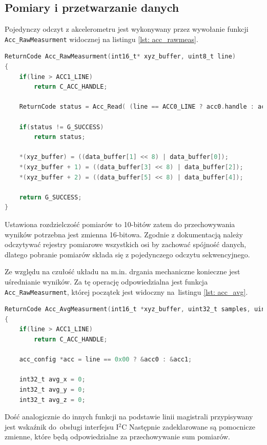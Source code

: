 \subsection{Pomiary i przetwarzanie danych}
Pojedynczy odczyt z akcelerometru jest wykonywany przez wywołanie funkcji \texttt{Acc\_RawMeasurment} widocznej na listingu \ref{lst: acc_rawmeas}.
\begin{lstlisting}[language=C,
caption={Funkcja realizująca pomiary},
label={lst: acc_rawmeas}]
ReturnCode Acc_RawMeasurment(int16_t* xyz_buffer, uint8_t line)
{
	if(line > ACC1_LINE)
		return C_ACC_HANDLE;

	ReturnCode status = Acc_Read( (line == ACC0_LINE ? acc0.handle : acc1.handle), data_buffer, ACC_X0_REG, 6);

	if(status != G_SUCCESS)
		return status;

	*(xyz_buffer) = ((data_buffer[1] << 8) | data_buffer[0]);
	*(xyz_buffer + 1) = ((data_buffer[3] << 8) | data_buffer[2]);
	*(xyz_buffer + 2) = ((data_buffer[5] << 8) | data_buffer[4]);

	return G_SUCCESS;
}
\end{lstlisting}
Ustawiona rozdzielczość pomiarów to 10-bitów zatem do przechowywania wyników potrzebna jest zmienna 16-bitowa. Zgodnie z dokumentacją należy odczytywać rejestry pomiarowe wszystkich osi by zachować spójność danych, dlatego pobranie pomiarów składa się z pojedynczego odczytu sekwencyjnego.

Ze względu na czułość układu na m.in. drgania mechaniczne konieczne jest uśrednianie wyników. Za tę operację odpowiedzialna jest funkcja \texttt{Acc\_RawMeasurment}, której początek jest widoczny na~listingu \ref{lst: acc_avg}.
\begin{lstlisting}[language=C,
caption={Początek funkcji \texttt{Acc\_AvgMeasurment}},
label={lst: acc_avg}]
ReturnCode Acc_AvgMeasurment(int16_t *xyz_buffer, uint32_t samples, uint8_t line)
{
	if(line > ACC1_LINE)
		return C_ACC_HANDLE;

	acc_config *acc = line == 0x00 ? &acc0 : &acc1;

	int32_t avg_x = 0;
	int32_t avg_y = 0;
	int32_t avg_z = 0;

\end{lstlisting}
Dość analogicznie do innych funkcji na podstawie linii magistrali przypisywany jest wskaźnik do~obsługi interfejsu I$^2$C Następnie zadeklarowane są pomocnicze zmienne, które będą odpowiedzialne za przechowywanie sum pomiarów. 

